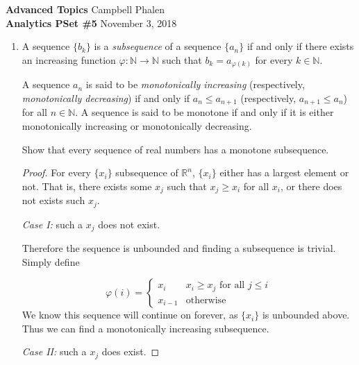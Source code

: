 \documentclass[11pt, leqno]{article}
\begin{document}
{\bfseries Advanced Topics} \hspace*{\fill} Campbell Phalen \\
{\bfseries Analytics PSet \#5} \hspace*{\fill}November 3, 2018
\vspace{1pc}

\hrulefill
\vspace{1pc}

\begin{enumerate}

	\item
	A sequence $\{b_k\}$ is a \textit{subsequence} of a sequence $\{a_n\}$ if and only if there exists an increasing function $\varphi : \mathbb{N} \rightarrow \mathbb{N}$ such that $b_k = a_{\varphi (k)}$ for every $k \in \mathbb{N}$.
	
	A sequence ${a_n}$ is said to be \textit{monotonically increasing} (respectively, \textit{monotonically decreasing}) if and only if $a_n \leq a_{n+1}$ (respectively, $a_{n+1} \leq a_n$) for all $n \in \mathbb{N}$. A sequence is said to be monotone if and only if it is either monotonically increasing or monotonically decreasing.
	
	Show that every sequence of real numbers has a monotone subsequence.
	
	\begin{proof}
	
	For every $\{x_i\}$ subsequence of $\mathbb{R}^n$, $\{x_i\}$ either has a largest element or not. That is, there exists some $x_j$ such that $x_j \geq x_i$ for all ${x_i}$, or there does not exists such $x_j$. 
	
	\textit{Case I: } such a $x_j$ does not exist.
	
	Therefore the sequence is unbounded and finding a subsequence is trivial. Simply define
	
	\[
		\varphi(i) = 
		\left\{
        			\begin{array}{ll}
           			x_i & x_i \geq {x_j} \text{ for all } j \leq i \\
            			x_{i-1}  &  \text{otherwise}
        			\end{array}
    		\right.
	\]
	We know this sequence will continue on forever, as $\{x_i\}$ is unbounded above. Thus we can find a monotonically increasing subsequence.
	
	\textit{Case II: } such a $x_j$ does exist.
	

\end{proof}
\end{enumerate}
\end{document}
